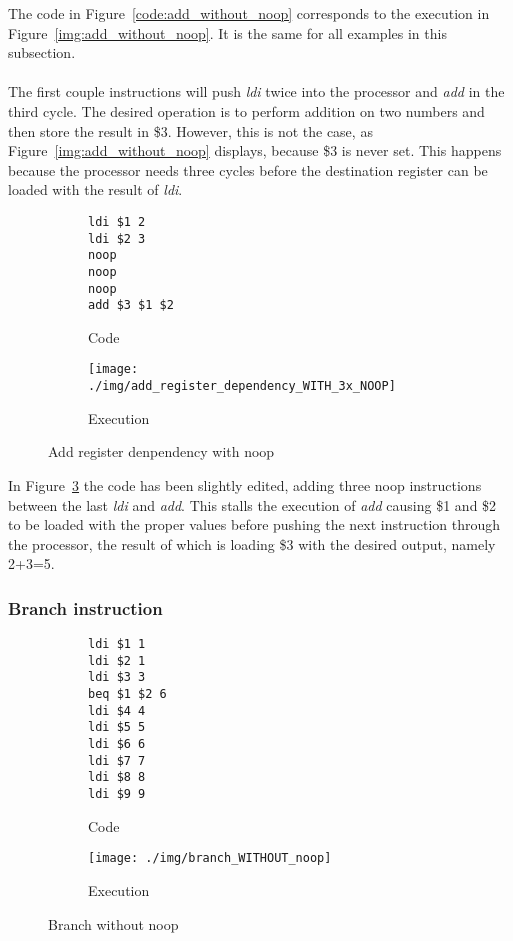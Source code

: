 The code in Figure~\ref{code:add_without_noop} corresponds to the execution in Figure~\ref{img:add_without_noop}. It is the same for all examples in this subsection.\\
\\
The first couple instructions will push \emph{ldi} twice into the processor and \emph{add} in the third cycle. The desired operation is to perform addition on two numbers and then store the result in \$3. However, this is not the case, as Figure~\ref{img:add_without_noop} displays, because \$3 is never set. This  happens because the processor needs three cycles before the destination register can be loaded with the result of \emph{ldi}.
\\
\begin{figure}[H]
	\begin{subfigure}[b]{.5\linewidth}
		\begin{lstlisting}[language={[mips]Assembler}]
ldi $1 2
ldi $2 3
noop
noop
noop
add $3 $1 $2
		\end{lstlisting}
		\caption{Code}
		\label{code:add_with_noop}
	\end{subfigure}
	\begin{subfigure}[b]{.5\linewidth}
		\centering
		\texttt{[image: ./img/add\_register\_dependency\_WITH\_3x\_NOOP]}
		\caption{Execution}
		\label{img:add_with_noop}
	\end{subfigure}
	\caption{Add register denpendency with noop}
	\label{add_with_noop}
\end{figure}

In Figure~\ref{add_with_noop} the code has been slightly edited, adding three noop instructions between the last \emph{ldi} and \emph{add}. This stalls the execution of \emph{add} causing \$1 and \$2 to be loaded with the proper values before pushing the next instruction through the processor, the result of which is loading \$3 with the desired output, namely 2+3=5.
\\

\subsubsection{Branch instruction} %
\label{subsub:branch_instruction}

\begin{figure}[H]
	\begin{subfigure}[b]{.5\linewidth}
		\begin{lstlisting}[language={[mips]Assembler}]
ldi $1 1
ldi $2 1
ldi $3 3
beq $1 $2 6
ldi $4 4
ldi $5 5
ldi $6 6
ldi $7 7
ldi $8 8
ldi $9 9
		\end{lstlisting}
		\caption{Code}
		\label{code:branch_without_noop}
	\end{subfigure}
	\begin{subfigure}[b]{.5\linewidth}
		\centering
		\texttt{[image: ./img/branch\_WITHOUT\_noop]}
		\caption{Execution}
		\label{img:branch_without_noop}
	\end{subfigure}
	\caption{Branch without noop}
	\label{branch_without_noop}
\end{figure}

